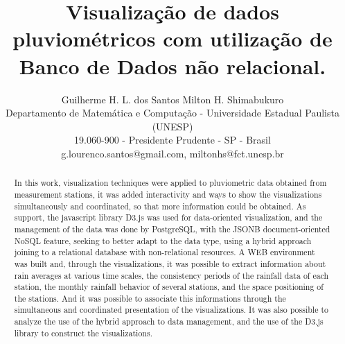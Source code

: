 \documentclass[article,11pt,oneside,a4paper]{abntex2} %
\date{}
\begin{document}
	\pagestyle{plain}
	
	\title{\Large Visualização de dados pluviométricos com utilização de Banco de Dados não relacional.}
	\author{\large Guilherme H. L. dos Santos \hspace{.25cm} \large Milton H. Shimabukuro\\
		Departamento de Matemática e Computação - Universidade Estadual Paulista (UNESP)\\
		19.060-900 - Presidente Prudente - SP - Brasil\\
		g.lourenco.santos@gmail.com, miltonhs@fct.unesp.br}

	\maketitle
	
	\renewcommand{\abstractname}{Abstract} 
	\begin{abstract}

	In this work, visualization techniques were applied to pluviometric data obtained from measurement stations, it was added interactivity and ways to show the visualizations simultaneously and coordinated, so that more information could be obtained. As support, the javascript library D3.js was used for data-oriented visualization, and the management of the data was done by PostgreSQL, with the JSONB document-oriented NoSQL feature, seeking to better adapt to the data type, using a hybrid approach joining to a relational database with non-relational resources. A WEB environment was built and, through the visualizations, it was possible to extract information about rain averages at various time scales, the consistency periods of the rainfall data of each station, the monthly rainfall behavior of several stations, and the space positioning of the stations. And it was possible to associate this informations through the simultaneous and coordinated presentation of the visualizations. It was also possible to analyze the use of the hybrid approach to data management, and the use of the D3.js library to construct the visualizations.

	\end{abstract}
\end{document}
